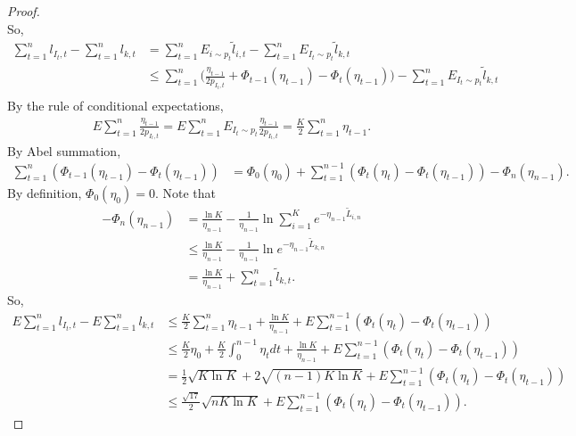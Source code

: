 \begin{proof}
\begin{equation}
    \end{equation}
    So,
    \begin{align}
        \sum_{t=1}^n l_{I_t, t} - \sum_{t=1}^n l_{k,t}
            &= \sum_{t=1}^n E_{i\sim p_t}\tilde l_{i,t} - \sum_{t=1}^n E_{I_t\sim p_t}\tilde l_{k,t} \\
            &\le \sum_{t=1}^n \bigg(\frac{\eta_{t-1}}{2p_{I_t,t}} + \Phi_{t-1}(\eta_{t-1}) - \Phi_t(\eta_{t-1})\bigg)
                - \sum_{t=1}^n E_{I_t\sim p_t}\tilde l_{k,t} \\
    \end{align}
    By the rule of conditional expectations,
    \begin{align}
        E\sum_{t=1}^n \frac{\eta_{t-1}}{2p_{I_t,t}}
            = E\sum_{t=1}^n E_{I_t\sim p_t}\frac{\eta_{t-1}}{2p_{I_t,t}}
            = \frac{K}{2}\sum_{t=1}^n\eta_{t-1}.
    \end{align}
    By Abel summation,
    \begin{align}
        \sum_{t=1}^n ( \Phi_{t-1}(\eta_{t-1}) - \Phi_t(\eta_{t-1}))
            &= \Phi_0(\eta_0) + \sum_{t=1}^{n-1} ( \Phi_t(\eta_t) - \Phi_t(\eta_{t-1})) -\Phi_n(\eta_{n-1}).
    \end{align}
    By definition, $\Phi_0(\eta_0)=0$. Note that
    \begin{align}
        -\Phi_n(\eta_{n-1})
            &= \frac{\ln K}{\eta_{n-1}} - \frac{1}{\eta_{n-1}}\ln \sum_{i=1}^K e^{-\eta_{n-1}\tilde L_{i,n}} \\
            &\le \frac{\ln K}{\eta_{n-1}} - \frac{1}{\eta_{n-1}}\ln e^{-\eta_{n-1}\tilde L_{k,n}} \\
            &= \frac{\ln K}{\eta_{n-1}} + \sum_{t=1}^n \tilde l_{k,t}.
    \end{align}
    So,
    \begin{align}
        E\sum_{t=1}^n l_{I_t, t} - E\sum_{t=1}^n l_{k,t}
            &\le \frac{K}{2}\sum_{t=1}^n\eta_{t-1} + \frac{\ln K}{\eta_{n-1}}
                + E\sum_{t=1}^{n-1} ( \Phi_t(\eta_t) - \Phi_t(\eta_{t-1})) \\
            &\le  \frac{K}{2}\eta_0 + \frac{K}{2} \int_0^{n-1}\eta_t dt + \frac{\ln K}{\eta_{n-1}}
                + E\sum_{t=1}^{n-1} ( \Phi_t(\eta_t) - \Phi_t(\eta_{t-1})) \\
            &= \frac{1}{2}\sqrt{K\ln K} + 2\sqrt{(n-1)K\ln K}
                + E\sum_{t=1}^{n-1} ( \Phi_t(\eta_t) - \Phi_t(\eta_{t-1})) \\
            &\le \frac{\sqrt{17}}{2}\sqrt{nK\ln K}
                + E\sum_{t=1}^{n-1} ( \Phi_t(\eta_t) - \Phi_t(\eta_{t-1})).

\end{align}
\end{proof}
